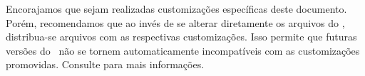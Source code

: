 \documentclass[
	10pt,				%
	openright,			%
	twoside,			%
	a5paper,			%
	english,			%
	french,				%
	brazil,				%
	sumario=tradicional
]{abntex2}
\begin{document}
Encorajamos que sejam realizadas customizações específicas deste documento.
Porém, recomendamos que ao invés de se alterar diretamente os arquivos do
\abnTeX, distribua-se arquivos com as respectivas customizações.
Isso permite que futuras versões do \abnTeX~não se tornem automaticamente
incompatíveis com as customizações promovidas. Consulte
 para mais informações.
\end{document}
